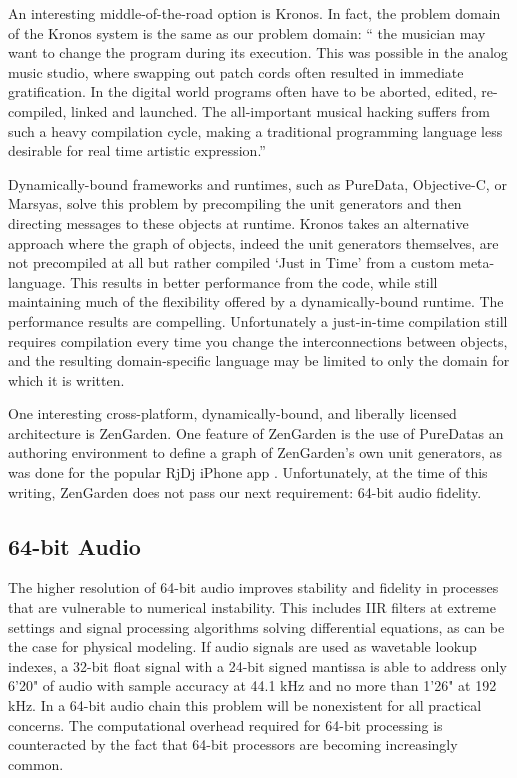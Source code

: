 \documentclass[twoside,10pt]{article}
\begin{document}

An interesting middle-of-the-road option is Kronos.  In fact, the problem domain of the Kronos system is the same as our problem domain: `` the musician may want to change the program during its execution. This was possible in the analog music studio, where swapping out patch cords often resulted in immediate gratification. In the digital world programs often have to be aborted, edited, re-compiled, linked and launched. The all-important musical hacking suffers from such a heavy compilation cycle, making a traditional programming language less desirable for real time artistic expression.'' \cite{Norilo:2009}

Dynamically-bound frameworks and runtimes, such as PureData, Objective-C, or Marsyas, solve this problem by precompiling the unit generators and then directing messages to these objects at runtime.  Kronos takes an alternative approach where the graph of objects, indeed the unit generators themselves, are not precompiled at all but rather compiled `Just in Time' from a custom meta-language. This results in better performance from the code, while still maintaining much of the flexibility offered by a dynamically-bound runtime.  The performance results are compelling.  Unfortunately a just-in-time compilation still requires compilation every time you change the interconnections between objects, and the resulting domain-specific language may be limited to only the domain for which it is written.

One interesting cross-platform, dynamically-bound, and liberally licensed architecture is ZenGarden\cite{web4}.  One feature of ZenGarden is the use of PureDatas an authoring environment to define a graph of ZenGarden's own unit generators, as was done for the popular RjDj iPhone app \cite{web5}.  Unfortunately, at the time of this writing, ZenGarden does not pass our next requirement: 64-bit audio fidelity.



\subsection{64-bit Audio} %

The higher resolution of 64-bit audio improves stability and fidelity in processes that are vulnerable to numerical instability.  This includes IIR filters at extreme settings and signal processing algorithms solving differential equations, as can be the case for physical modeling.  If audio signals are used as wavetable lookup indexes, a 32-bit float signal with a 24-bit signed mantissa is able to address only 6'20" of audio with sample accuracy at 44.1 kHz and no more than 1'26" at 192 kHz. In a 64-bit audio chain this problem will be nonexistent for all practical concerns. The computational overhead required for 64-bit processing is counteracted by the fact that 64-bit processors are becoming increasingly common.
\end{document}
